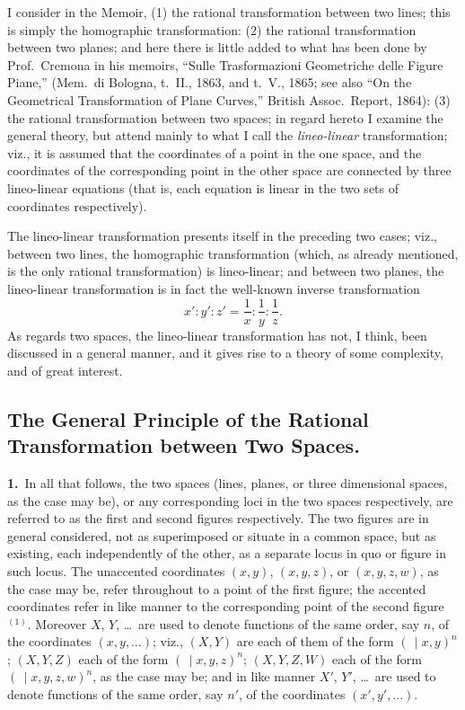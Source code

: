 \documentclass[11pt,a4paper]{article}
\begin{document}
I consider in the Memoir, (1) the rational transformation between two lines; this is simply the homographic transformation: (2) the rational transformation between two planes; and here there is little added to what has been done by Prof.\ Cremona in his memoirs, ``Sulle Trasformazioni Geometriche delle Figure Piane,'' (Mem.\ di Bologna, t.\ II., 1863, and t.\ V., 1865; see also ``On the Geometrical Transformation of Plane Curves,'' British Assoc.\ Report, 1864): (3) the rational transformation between two spaces; in regard hereto I examine the general theory, but attend mainly to what I call the \textit{lineo-linear} transformation; viz., it is assumed that the coordinates of a point in the one space, and the coordinates of the corresponding point in the other space are connected by three lineo-linear equations (that is, each equation is linear in the two sets of coordinates respectively).


\newpage
\setcounter{page}{190}

\noindent The lineo-linear transformation presents itself in the preceding two cases; viz., between two lines, the homographic transformation (which, as already mentioned, is the only rational transformation) is lineo-linear; and between two planes, the lineo-linear transformation is in fact the well-known inverse transformation
\[
x' : y' : z' = \frac{1}{x} : \frac{1}{y} : \frac{1}{z}.
\]
As regards two spaces, the lineo-linear transformation has not, I think, been discussed in a general manner, and it gives rise to a theory of some complexity, and of great interest.

\subsection*{The General Principle of the Rational Transformation between Two Spaces.}

\textbf{1.}\ In all that follows, the two spaces (lines, planes, or three dimensional spaces, as the case may be), or any corresponding loci in the two spaces respectively, are referred to as the first and second figures respectively. The two figures are in general considered, not as superimposed or situate in a common space, but as existing, each independently of the other, as a separate locus in quo or figure in such locus. The unaccented coordinates $(x, y)$, $(x, y, z)$, or $(x, y, z, w)$, as the case may be, refer throughout to a point of the first figure; the accented coordinates refer in like manner to the corresponding point of the second figure$^{(1)}$. Moreover $X$, $Y$, \ldots\ are used to denote functions of the same order, say $n$, of the coordinates $(x, y, \ldots)$; viz., $(X, Y)$ are each of them of the form $(\, \mid x, y)^n$; $(X, Y, Z)$ each of the form $(\, \mid x, y, z)^n$; $(X, Y, Z, W)$ each of the form $(\, \mid x, y, z, w)^n$, as the case may be; and in like manner $X'$, $Y'$, \ldots\ are used to denote functions of the same order, say $n'$, of the coordinates $(x', y', \ldots)$.
\end{document}

